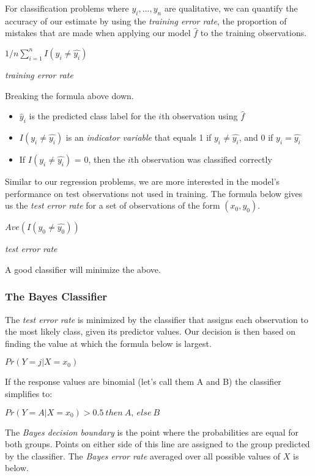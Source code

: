 \documentclass[]{book}
\providecommand{\tightlist}{%
  \setlength{\itemsep}{0pt}\setlength{\parskip}{0pt}}
\begin{document}
For classification problems where \(y_i,...,y_n\) are qualitative, we can quantify the accuracy of our estimate by using the \emph{training error rate}, the proportion of mistakes that are made when applying our model \(\hat{f}\) to the training observations.

\(1/n\sum_{i=1}^nI(y_i \neq \hat{y_i})\)

\emph{training error rate}

Breaking the formula above down.

\begin{itemize}
\tightlist
\item
  \(\hat{y}_i\) is the predicted class label for the \(i\)th observation using \(\hat{f}\)
\item
  \(I(y_i \neq \hat{y_i})\) is an \emph{indicator variable} that equals 1 if \(y_i \neq \hat{y_i}\), and 0 if \(y_i = \hat{y_i}\)
\item
  If \(I(y_i \neq \hat{y_i})\) = 0, then the \(i\)th observation was classified correctly
\end{itemize}

Similar to our regression problems, we are more interested in the model's performance on test observations not used in training. The formula below gives us the \emph{test error rate} for a set of observations of the form \((x_0, y_0)\).

\(Ave(I(y_0 \neq \hat{y_0}))\)

\emph{test error rate}

A good classifier will minimize the above.

\hypertarget{the-bayes-classifier}{%
\subsubsection{The Bayes Classifier}\label{the-bayes-classifier}}

The \emph{test error rate} is minimized by the classifier that assigns each observation to the most likely class, given its predictor values. Our decision is then based on finding the value at which the formula below is largest.

\(Pr(Y = j|X = x_0)\)

If the response values are binomial (let's call them A and B) the classifier simplifies to:

\(Pr(Y = A|X = x_0) > 0.5\:then\:A,\:else\:B\)

The \emph{Bayes decision boundary} is the point where the probabilities are equal for both groups. Points on either side of this line are assigned to the group predicted by the classifier. The \emph{Bayes error rate} averaged over all possible values of \(X\) is below.
\end{document}
